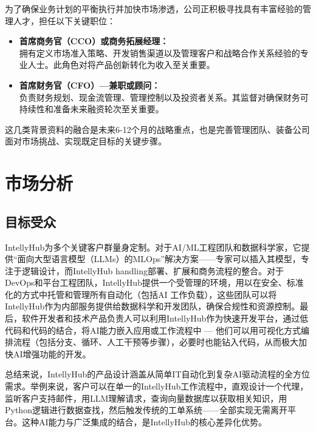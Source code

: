 \documentclass[11点, A4纸, 单面]{article}
\begin{document}
为了确保业务计划的平衡执行并加快市场渗透，公司正积极寻找具有丰富经验的管理人才，担任以下关键职位：

\begin{itemize}
    \item \textbf{首席商务官（CCO）或商务拓展经理：} \\
    拥有定义市场准入策略、开发销售渠道以及管理客户和战略合作关系经验的专业人士。此角色对将产品创新转化为收入至关重要。

    \item \textbf{首席财务官（CFO）—兼职或顾问：} \\
    负责财务规划、现金流管理、管理控制以及投资者关系。其监督对确保财务可持续性和准备未来融资轮次至关重要。
\end{itemize}

这几类背景资料的融合是未来6-12个月的战略重点，也是完善管理团队、装备公司面对市场挑战、实现既定目标的关键步骤。

\section{市场分析}
\subsection{目标受众}
IntellyHub为多个关键客户群量身定制。对于AI/ML工程团队和数据科学家，它提供“面向大型语言模型（LLMs）的MLOps”解决方案——专家可以插入其模型，专注于逻辑设计，而IntellyHub handling部署、扩展和商务流程的整合。对于DevOps和平台工程团队，IntellyHub提供一个受管理的环境，用以在安全、标准化的方式中托管和管理所有自动化（包括AI 工作负载），这些团队可以将IntellyHub作为内部服务提供给数据科学和开发团队，确保合规性和资源控制。最后，软件开发者和技术产品负责人可以利用IntellyHub作为快速开发平台，通过低代码和代码的结合，将AI能力嵌入应用或工作流程中 — 他们可以用可视化方式编排流程（包括分支、循环、人工干预等步骤），必要时也能钻入代码，从而极大加快AI增强功能的开发。

总结来说，IntellyHub的产品设计涵盖从简单IT自动化到复杂AI驱动流程的全方位需求。举例来说，客户可以在单一的IntellyHub工作流程中，直观设计一个代理，监听客户支持邮件，用LLM理解请求，查询向量数据库以获取相关知识，用Python逻辑进行数据查找，然后触发传统的工单系统——全部实现无需离开平台。这种AI能力与广泛集成的结合，是IntellyHub的核心差异化优势。
\end{document}
